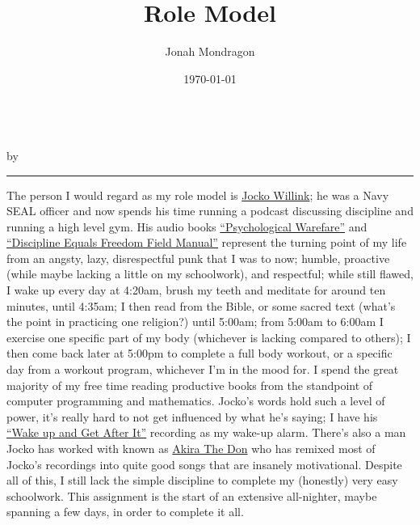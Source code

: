 \documentclass[10pt]{article}
\title{Role Model}
\author{Jonah Mondragon}
\date{\today}
\renewcommand{\maketitle}
{
    \begin{center}
        {\huge\bfseries\thetitle}\\
        \vspace{1ex}
        by \theauthor\\
        \thedate
    \end{center}
    \hrule
    \vspace{3ex}
}
\begin{document}
\pagestyle{empty}
\maketitle

\doublespacing

The person I would regard as my role model is \href{https://jockopodcast.com/about/}{Jocko Willink}; he was a Navy SEAL officer
and now spends his time running a podcast discussing discipline and running a high level gym. His audio books
\href{https://www.youtube.com/watch?v=VS18QVQqApQ&list=PLqb3Ua5zACVJZAJ3W4zGCbkzW1mKfmKG2&index=1}{``Psychological Warefare''} 
and 
\href{https://www.youtube.com/watch?v=uLyBTEJQVbQ&list=PLJTFXZw7PaPSAvZKjONcEJuIeQuLWcndh&index=1}{``Discipline Equals Freedom 
Field Manual''}
represent the turning point of my life from an angsty, lazy, disrespectful punk that I was to now; humble, proactive (while maybe
lacking a little on my schoolwork), and respectful; while still flawed, I wake
up every day at 4:20am, brush my teeth and meditate for around ten minutes, until 4:35am; I then read from the Bible, or some
sacred text (what's the point in practicing one religion?) until 5:00am; from 5:00am to 6:00am I exercise one specific part of my
body (whichever is lacking compared to others); I then come back later at 5:00pm to complete a full body workout, or a specific
day from a workout program, whichever I'm in the mood for. I spend the great majority of my free time reading productive books
from the standpoint of computer programming and mathematics. Jocko's words hold such a level of power, it's really hard to not get
influenced by what he's saying; I have his 
\href{https://www.youtube.com/watch?v=VS18QVQqApQ&list=PLqb3Ua5zACVJZAJ3W4zGCbkzW1mKfmKG2&index=1}{``Wake up and Get After It''}
recording as my wake-up alarm. There's also a man Jocko has worked with known as 
\href{https://www.youtube.com/watch?v=qjQC-0H574c}{Akira The Don}
who has remixed most of Jocko's
recordings into quite good songs that are insanely motivational. 
Despite all of this, I still lack the simple discipline to complete my (honestly) very easy schoolwork.
This assignment is the start of an extensive all-nighter, maybe spanning a few days, in order to complete it all.
\end{document}
